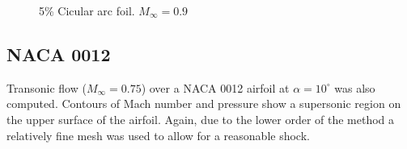 \documentclass[12pt]{article}
\begin{document}
\begin{figure}[ht]
{}
\caption{5\% Cicular arc foil. $M_{\infty}=0.9$}
\label{bump}
\end{figure}


 \pagebreak
 \subsection{NACA 0012}

Transonic flow ($M_{\infty} = 0.75$) over a NACA 0012 airfoil at $\alpha = 10^{\circ}$ was also computed. Contours of Mach number and pressure show a supersonic region on the upper surface of the airfoil. Again, due to the lower order of the method a relatively fine mesh was used to allow for a reasonable shock.

\begin{figure}[ht]
\centering
{}
\hspace{-0.25in}
\end{figure}
\end{document}
